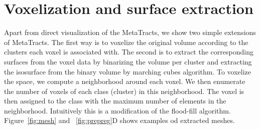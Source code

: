 %
%


\section {Voxelization and surface extraction}
\label{sec:vis}
Apart from direct visualization of the MetaTracts, we show two simple extensions of MetaTracts. The first way is to voxelize the original volume according to the clusters each voxel is associated with.
The second is to extract the corresponding surfaces from the voxel data by binarizing the volume per cluster and extracting the isosurface from the binary volume by marching cubes algorithm. To voxelize the space,  we compute a neighborhood around each voxel. We then enumerate the number of voxels of each class (cluster) in this neighborhood. The voxel is then assigned to the class with the maximum number of elements in the neighborhood.  Intuitively this is a modification of the flood-fill algorithm. Figure~\ref{fig:mesh} and ~\ref{fig:prepreg}D shows examples od extracted meshes.


